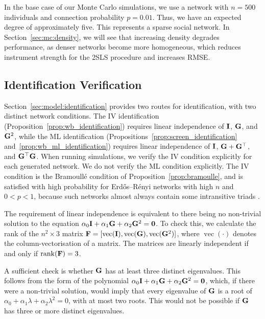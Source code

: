 In the base case of our Monte Carlo simulations, we use a network with $n = 500$ individuals and connection probability $p = 0.01$. Thus, we have an expected degree of approximately five. This represents a sparse social network. In Section~\ref{sec:mc:density}, we will see that increasing density degrades performance, as denser networks become more homogeneous, which reduces instrument strength for the 2SLS procedure and increases RMSE\@.

\subsection{Identification Verification}
\label{sec:mc:check_identification}
Section~\ref{sec:model:identification} provides two routes for identification, with two distinct network conditions. The IV identification (Proposition~\ref{prop:wb_identification}) requires linear independence of $\mathbf{I}$, $\mathbf{G}$, and $\mathbf{G}^2$, while the ML identification (Propositions~\ref{prop:screen_identification} and~\ref{prop:wb_ml_identification}) requires linear independence of $\mathbf{I}$, $\mathbf{G} + \mathbf{G}^\top$, and $\mathbf{G}^\top\mathbf{G}$. When running simulations, we verify the IV condition explicitly for each generated network. We do not verify the ML condition explicitly. The IV condition is the Bramoull\'e condition of Proposition~\ref{prop:bramoulle}, and is satisfied with high probability for Erd\H{o}s--R\'enyi networks with high $n$ and $0 < p < 1$, because such networks almost always contain some intransitive triads \parencite[p.~46]{Bramoulle2009}.

The requirement of linear independence is equivalent to there being no non-trivial solution to the equation $\alpha_0 \mathbf{I} + \alpha_1 \mathbf{G} + \alpha_2 \mathbf{G}^2 = \mathbf{0}$. To check this, we calculate the rank of the $n^2 \times 3$ matrix $\mathbf{F} = [\operatorname{vec}(\mathbf{I}), \operatorname{vec}(\mathbf{G}), \operatorname{vec}(\mathbf{G}^2)]$, where $\operatorname{vec}(\cdot)$ denotes the column-vectorisation of a matrix. The matrices are linearly independent if and only if $\operatorname{rank}(\mathbf{F}) = 3$.

A sufficient check is whether $\mathbf{G}$ has at least three distinct eigenvalues. This follows from the form of the polynomial $\alpha_0 \mathbf{I} + \alpha_1 \mathbf{G} + \alpha_2 \mathbf{G}^2 = \mathbf{0}$, which, if there were a non-trivial solution, would imply that every eigenvalue of $\mathbf{G}$ is a root of $\alpha_0 + \alpha_1 \lambda + \alpha_2 \lambda^2 = 0$, with at most two roots. This would not be possible if $\mathbf{G}$ has three or more distinct eigenvalues.

